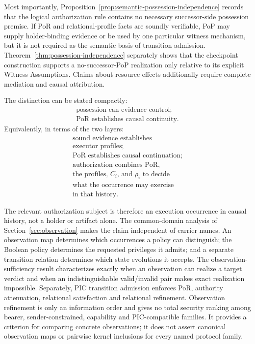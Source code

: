 \documentclass[10pt,twocolumn]{article}
\begin{document}
Most importantly, Proposition~\ref{prop:semantic-possession-independence}
records that the logical authorization rule contains no necessary
successor-side possession premise. If PoR and relational-profile facts are
soundly verifiable, PoP may supply holder-binding evidence or be used by one
particular witness mechanism, but it is not required as the semantic basis of
transition admission. Theorem~\ref{thm:possession-independence} separately
shows that the checkpoint construction supports a no-successor-PoP realization
only relative to its explicit Witness Assumptions. Claims about resource effects
additionally require complete mediation and causal attribution.

The distinction can be stated compactly:
\[
\boxed{
\begin{gathered}
\text{possession can evidence control;}\\
\text{PoR establishes causal continuity.}
\end{gathered}
}
\]
Equivalently, in terms of the two layers:
\[
\boxed{
\begin{array}{c}
\text{sound evidence establishes}\\
\text{executor profiles;}\\
\text{PoR establishes causal continuation;}\\
\text{authorization combines PoR,}\\
\text{the profiles, \(C_i\), and \(\rho_i\) to decide}\\
\text{what the occurrence may exercise}\\
\text{in that history.}
\end{array}
}
\]

The relevant authorization subject is therefore an execution occurrence in
causal history, not a holder or artifact alone. The common-domain analysis of
Section~\ref{sec:observation} makes the claim independent of carrier names. An
observation map determines which occurrences a policy can distinguish; the
Boolean policy determines the requested privileges it admits; and a separate
transition relation determines which state evolutions it accepts. The
observation-sufficiency result characterizes exactly when an observation can
realize a target verdict and when an indistinguishable valid/invalid pair makes
exact realization impossible. Separately, PIC transition admission enforces
PoR, authority attenuation, relational satisfaction and relational refinement.
Observation refinement is only an information order and gives no total security
ranking among bearer, sender-constrained, capability and PIC-compatible
families. It provides a criterion for comparing concrete observations; it does
not assert canonical observation maps or pairwise kernel inclusions for every
named protocol family.
\end{document}
